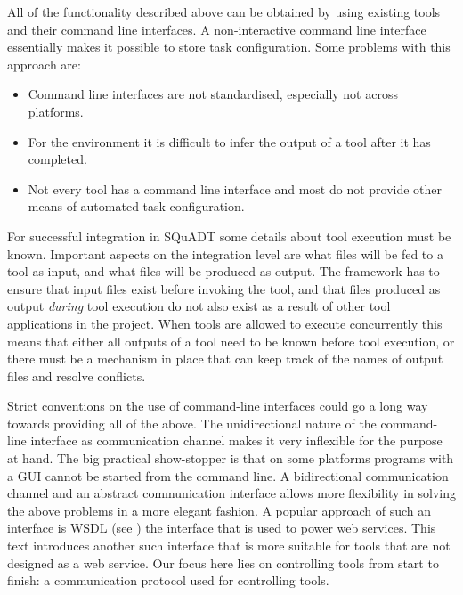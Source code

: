 \documentclass{article}
\newcommand{\squadt}{SQuADT\xspace}
\begin{document}
  All of the functionality described above can be obtained by using existing
  tools and their command line interfaces. A non-interactive command line
  interface essentially makes it possible to store task configuration. Some
  problems with this approach are:
  \begin{itemize}
   \item Command line interfaces are not standardised, especially not across
         platforms.
   \item For the environment it is difficult to infer the output of a tool
         after it has completed.
   \item Not every tool has a command line interface and most do not provide
         other means of automated task configuration.
  \end{itemize}

  \noindent For successful integration in \squadt some details about tool
  execution must be known. Important aspects on the integration level are what
  files will be fed to a tool as input, and what files will be produced as
  output. The framework has to ensure that input files exist before invoking
  the tool, and that files produced as output \emph{during} tool execution do
  not also exist as a result of other tool applications in the project. When
  tools are allowed to execute concurrently this means that either all outputs
  of a tool need to be known before tool execution, or there must be a
  mechanism in place that can keep track of the names of output files and
  resolve conflicts.
  
  Strict conventions on the use of command-line interfaces could go a long way
  towards providing all of the above. The unidirectional nature of the
  command-line interface as communication channel makes it very inflexible for
  the purpose at hand. The big practical show-stopper is that on some platforms
  programs with a GUI cannot be started from the command line. A bidirectional
  communication channel and an abstract communication interface allows more
  flexibility in solving the above problems in a more elegant fashion. A
  popular approach of such an interface is WSDL (see \cite{2001-WSDL}) the
  interface that is used to power web services.  This text introduces another
  such interface that is more suitable for tools that are not designed as a
  web service. Our focus here lies on controlling tools from start to finish: a
  communication protocol used for controlling tools.

\end{document}
